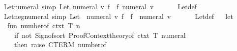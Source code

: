 \begin{isabellebody}
\isanewline
{}\isamarkupfalse%
\ Let{\isacharunderscore}{\kern0pt}numeral\ {\isacharbrackleft}{\kern0pt}simp{\isacharbrackright}{\kern0pt}{\isacharcolon}{\kern0pt}\ {\isachardoublequoteopen}Let\ {\isacharparenleft}{\kern0pt}numeral\ v{\isacharparenright}{\kern0pt}\ f\ {\isacharequal}{\kern0pt}\ f\ {\isacharparenleft}{\kern0pt}numeral\ v{\isacharparenright}{\kern0pt}{\isachardoublequoteclose}\isanewline
\ \ %
\isanewline
%
\isadelimproof
\ \ %
\endisadelimproof
%
\isatagproof
{}\isamarkupfalse%
\ Let{\isacharunderscore}{\kern0pt}def\ \isacommand{{\isachardot}{\kern0pt}{\isachardot}{\kern0pt}}\isamarkupfalse%
%
\endisatagproof
{\isafoldproof}%
%
\isadelimproof
\isanewline
%
\endisadelimproof
\isanewline
{}\isamarkupfalse%
\ Let{\isacharunderscore}{\kern0pt}neg{\isacharunderscore}{\kern0pt}numeral\ {\isacharbrackleft}{\kern0pt}simp{\isacharbrackright}{\kern0pt}{\isacharcolon}{\kern0pt}\ {\isachardoublequoteopen}Let\ {\isacharparenleft}{\kern0pt}{\isacharminus}{\kern0pt}\ numeral\ v{\isacharparenright}{\kern0pt}\ f\ {\isacharequal}{\kern0pt}\ f\ {\isacharparenleft}{\kern0pt}{\isacharminus}{\kern0pt}\ numeral\ v{\isacharparenright}{\kern0pt}{\isachardoublequoteclose}\isanewline
\ \ %
\isanewline
%
\isadelimproof
\ \ %
\endisadelimproof
%
\isatagproof
{}\isamarkupfalse%
\ Let{\isacharunderscore}{\kern0pt}def\ \isacommand{{\isachardot}{\kern0pt}{\isachardot}{\kern0pt}}\isamarkupfalse%
%
\endisatagproof
{\isafoldproof}%
%
\isadelimproof
\isanewline
%
\endisadelimproof
%
\isadelimML
\isanewline
%
\endisadelimML
%
\isatagML
{}\isamarkupfalse%
\ {\isacartoucheopen}\isanewline
let\isanewline
\ \ fun\ number{\isacharunderscore}{\kern0pt}of\ ctxt\ T\ n\ {\isacharequal}{\kern0pt}\isanewline
\ \ \ \ if\ not\ {\isacharparenleft}{\kern0pt}Sign{\isachardot}{\kern0pt}of{\isacharunderscore}{\kern0pt}sort\ {\isacharparenleft}{\kern0pt}Proof{\isacharunderscore}{\kern0pt}Context{\isachardot}{\kern0pt}theory{\isacharunderscore}{\kern0pt}of\ ctxt{\isacharparenright}{\kern0pt}\ {\isacharparenleft}{\kern0pt}T{\isacharcomma}{\kern0pt}\ \isactrlsort {\isasymopen}numeral{\isasymclose}{\isacharparenright}{\kern0pt}{\isacharparenright}{\kern0pt}\isanewline
\ \ \ \ then\ raise\ CTERM\ {\isacharparenleft}{\kern0pt}{\isachardoublequote}{\kern0pt}number{\isacharunderscore}{\kern0pt}of{\isachardoublequote}{\kern0pt}{\isacharcomma}{\kern0pt}\ {\isacharbrackleft}{\kern0pt}{\isacharbrackright}{\kern0pt}{\isacharparenright}{\kern0pt}\isanewline

\end{isabellebody}
